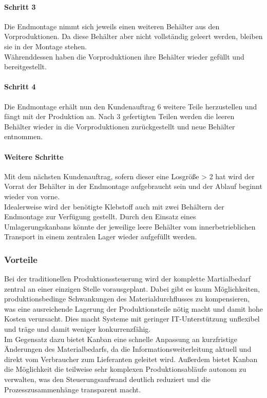 \documentclass[00_ToyotaProduktionssystem.tex]{subfiles}
\begin{document}
\paragraph{Schritt 3}
Die Endmontage nimmt sich jeweils einen weiteren Behälter aus den Vorproduktionen. Da diese Behälter aber nicht vollständig geleert werden, bleiben sie in der Montage stehen.\\
Währenddessen haben die Vorproduktionen ihre Behälter wieder gefüllt und bereitgestellt.

\paragraph{Schritt 4}
Die Endmontage erhält nun den Kundenauftrag 6 weitere Teile herzustellen und fängt mit der Produktion an. Nach 3 gefertigten Teilen werden die leeren Behälter wieder in die Vorproduktionen zurückgestellt und neue Behälter entnommen.

\paragraph{Weitere Schritte}
Mit dem nächsten Kundenauftrag, sofern dieser eine Losgröße > 2 hat wird der Vorrat der Behälter in der Endmontage aufgebraucht sein und der Ablauf beginnt wieder von vorne.\\
Idealerweise wird der benötigte Klebstoff auch mit zwei Behältern der Endmontage zur Verfügung gestellt. Durch den Einsatz eines Umlagerungskanbans könnte der jeweilige leere Behälter vom innerbetrieblichen Transport in einem zentralen Lager wieder aufgefüllt werden.

\subsubsection{Vorteile}
Bei der traditionellen Produktionssteuerung wird der komplette Martialbedarf zentral an einer einzigen Stelle vorausgeplant. Dabei gibt es kaum Möglichkeiten, produktionsbedinge Schwankungen des Materialdurchflusses zu kompensieren, was eine ausreichende Lagerung der Produktionsteile nötig macht und damit hohe Kosten verursacht. Dies macht Systeme mit geringer IT-Unterstützung unflexibel und träge und damit weniger konkurrenzfähig.\\
Im Gegensatz dazu bietet Kanban eine schnelle Anpassung an kurzfristige Änderungen des Materialbedarfs, da die Informationsweiterleitung aktuell und direkt vom Verbraucher zum Lieferanten geleitet wird. Außerdem bietet Kanban die Möglichkeit die teilweise sehr komplexen Produktionsabläufe autonom zu verwalten, was den Steuerungsaufwand deutlich reduziert und die Prozesszusammenhänge transparent macht.
\end{document}

